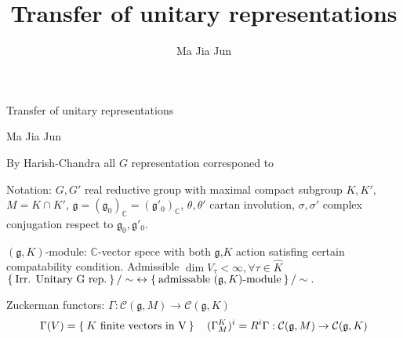 \documentclass{beamer}
\title{Transfer of unitary representations}
\author{Ma Jia Jun}
\begin{document}
\color{white}

\def\gg{{\mathfrak{g}}}
\def\kk{{\mathfrak{k}}}
\def\pp{{\mathfrak{p}}}
\def\qq{{\mathfrak{q}}}
\def\bC{{\mathbb{C}}}
\def\hK{{\widehat{K}}}
\def\cC{{\mathcal{C}}}

\begin{frame}[t]
\begin{center} 
\large Transfer of unitary representations
\end{center}
\begin{center}
 Ma Jia Jun
\end{center}
\end{frame}

\begin{frame}[t]
By Harish-Chandra all $G$ representation corresponed to 
\end{frame}
\begin{frame}[t]
Notation: $G,G'$ real reductive group with maximal compact subgroup
$K,K'$, $M=K\cap K'$,
$\gg=(\gg_0)_\bC=(\gg'_0)_\bC$, $\theta,\theta'$ cartan involution,
$\sigma,\sigma'$ complex conjugation respect to $\gg_0, \gg'_0$.
\end{frame}

\begin{frame}[t] $(\gg,K)$-module: $\bC$-vector spece with both $\gg$,$K$ action
satisfing certain compatability condition. Admissible
$\dim V_\tau < \infty, \forall \tau\in \hK$
$
\Set{\text{Irr. Unitary G rep.}}/\sim\; \leftrightarrow 
\Set{\text{admissable } (\gg,K)\text{-module}}/\sim.
$
\end{frame}

\begin{frame}[t]
Zuckerman functors: $\Gamma:\cC(\gg,M)\to \cC(\gg,K)$ 
\[
\Gamma(V) = \Set{K\text{ finite vectors in V}}
\quad
(\Gamma_M^K)^i=R^i\Gamma: \cC(\gg,M)\to \cC(\gg,K)
\]
\end{frame}
\end{document}
